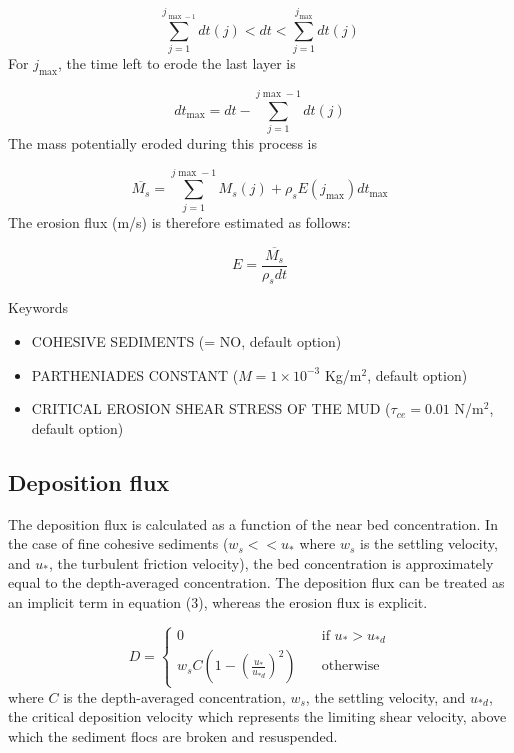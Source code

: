 \begin{equation*}
\sum_{j=1}^{j_{\max-1}} dt(j) < dt <\sum_{j=1}^{j_{\max}} dt(j) 
\end{equation*}
For $j_{\max}$, the time left to erode the last layer is

\begin{equation*}
dt_{\max} = dt-\sum_{j=1}^{j\max-1} dt(j) 
\end{equation*}%
The mass potentially eroded during this process is

\begin{equation*}
\overline{M_s} = \sum_{j=1}^{j\max-1} M_s(j) + \rho_s E(j_{\max}) dt_{\max} 
\end{equation*}
The erosion flux (m/s) is therefore estimated as follows: 

\begin{equation*}
E=\frac{\overline{M_{s}}}{\rho_s dt} 
\end{equation*}

\medskip
\begin{bclogo}[couleur=blue!10,arrondi=0.1, logo=\bcinfo]{Keywords}
\begin{itemize}
\item {\ttfamily COHESIVE SEDIMENTS} ({\ttfamily = NO}, default option)
\item {\ttfamily PARTHENIADES CONSTANT} ($M = 1\times 10^{-3}$ Kg/m$^2$, default option)
\item {\ttfamily CRITICAL EROSION SHEAR STRESS OF THE MUD} ($\tau_{ce} = 0.01$ N/m$^2$, default option)
\end{itemize}
\end{bclogo}

\subsection{Deposition flux }

The deposition flux is calculated as a function of the near bed
concentration. In the case of fine cohesive sediments ($w_s<< u_*$  where $w_s$ is the settling velocity, and 
$u_*$, the turbulent friction velocity), the bed concentration is approximately equal
to the depth-averaged concentration.  The
deposition flux can be treated as an implicit term in equation (3), whereas the erosion flux is
explicit.

\begin{equation*}
D = \left\{\begin{array}{ll}
\displaystyle
0 & \quad \text{if } u_* > u_{*d} \\
\displaystyle
w_s C\left(1-\left(\frac{u_*}{u_{*d}}\right)^2\right) & \quad \text{otherwise} 
\end{array}
\right.
\end{equation*}
where $C$ is the depth-averaged concentration, $w_s$, the settling velocity, and 
$u_{*d}$, the critical deposition velocity which
represents the limiting shear velocity, above which the sediment flocs are
broken and resuspended.

